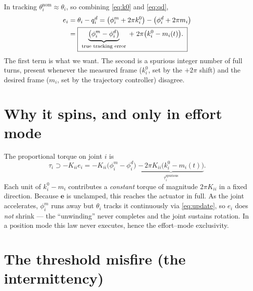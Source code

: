 \documentclass[11pt]{article}
\begin{document}
In tracking $\theta^{\mathrm{nom}}_i\approx\theta_i$, so combining
\eqref{eq:k0} and \eqref{eq:qd},
\begin{align}
e_i &= \theta_i - q^d_i
     = \big(\phi^m_i+2\pi k_i^0\big)-\big(\phi^d_i+2\pi m_i\big)\notag\\
\label{eq:err}
    &= \boxed{\;\underbrace{\big(\phi^m_i-\phi^d_i\big)}_{\text{true tracking error}}
        \;+\;2\pi\big(k_i^0-m_i(t)\big).\;}
\end{align}
The first term is what we want. The second is a spurious integer number of
full turns, present whenever the measured frame ($k_i^0$, set by the
$+2\pi$ shift) and the desired frame ($m_i$, set by the trajectory
controller) disagree.

\section{Why it spins, and only in effort mode}

The proportional torque on joint $i$ is
\begin{equation}
\tau_i \supset -K_{ii} e_i
   = -K_{ii}\big(\phi^m_i-\phi^d_i\big)
     \;\underbrace{-\,2\pi K_{ii}\big(k_i^0-m_i(t)\big)}_{\tau_i^{\mathrm{spurious}}}.
\end{equation}
Each unit of $k_i^0-m_i$ contributes a \emph{constant} torque of magnitude
$2\pi K_{ii}$ in a fixed direction. Because $\bm e$ is unclamped, this
reaches the actuator in full. As the joint accelerates, $\phi^m_i$ runs
away but $\theta_i$ tracks it continuously via \eqref{eq:update}, so $e_i$
does \emph{not} shrink --- the ``unwinding'' never completes and the joint
sustains rotation. In a position mode this law never executes, hence the
effort--mode exclusivity.

\section{The threshold misfire (the intermittency)}
\label{sec:misfire}
\end{document}
